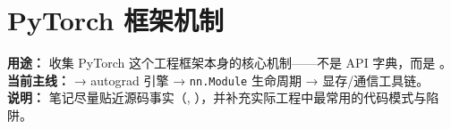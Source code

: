 
\part*{PyTorch 框架机制}
{}

\begin{conceptbox}
\textbf{用途：} 收集 PyTorch 这个工程框架本身的核心机制——不是 API 字典，而是 。\\
\textbf{当前主线：}  → autograd 引擎 → \texttt{nn.Module} 生命周期 → 显存/通信工具链。\\
\textbf{说明：} 笔记尽量贴近源码事实（, ），并补充实际工程中最常用的代码模式与陷阱。
\end{conceptbox}


